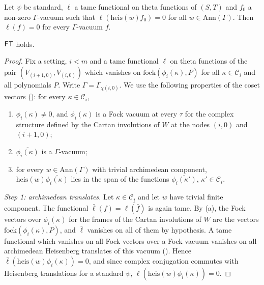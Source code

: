 \begin{lemma}\label{pf:fs:irr}
Let $\psi$ be standard, $\ell$ a tame functional on theta functions of $(S,T)$ and $f_0$ a non-zero $\Gamma$-vacuum such that
$\ell(\mathrm{heis}(w)f_0)=0$ for all $w\in\mathrm{Ann}(\Gamma)$. Then $\ell(f)=0$ for every $\Gamma$-vacuum $f$.
\end{lemma}

\begin{proposition}\label{pf:fs:fockTot}
$\mathsf{FT}$ holds.
\end{proposition}

\begin{proof}
Fix a setting, $i<m$ and a tame functional $\ell$ on theta functions of the pair $(V_{(i+1,0)},V_{(i,0)})$ which vanishes on
$\overline{\mathrm{fock}(\phi_i(\kappa),P)}$ for all $\kappa\in\mathcal C_i$ and all polynomials $P$. Write $\Gamma=\Gamma_{\chi(i,0)}$.
We use the following properties of the coset vectors ():
for every $\kappa\in\mathcal C_i$,
\begin{enumerate}[label=(\alph*)]
\item $\phi_i(\kappa)\ne0$, and $\phi_i(\kappa)$ is a Fock vacuum at every $\tau$ for the complex structure defined by the Cartan
involutions of $W$ at the nodes $(i,0)$ and $(i+1,0)$;
\item $\overline{\phi_i(\kappa)}$ is a $\Gamma$-vacuum;
\item for every $w\in\mathrm{Ann}(\Gamma)$ with trivial archimedean component, $\mathrm{heis}(w)\overline{\phi_i(\kappa)}$ lies in the span of
the functions $\overline{\phi_i(\kappa')}$, $\kappa'\in\mathcal C_i$.
\end{enumerate}

\emph{Step 1: archimedean translates.} Let $\kappa\in\mathcal C_i$ and let $w$ have trivial finite component. The functional
$\bar\ell(f)=\overline{\ell(\bar f)}$ is again tame. By (a), the Fock vectors over $\phi_i(\kappa)$ for the frames of the Cartan
involutions of $W$ are the vectors $\mathrm{fock}(\phi_i(\kappa),P)$, and $\bar\ell$ vanishes on all of them by hypothesis. A tame
functional which vanishes on all Fock vectors over a Fock vacuum vanishes on all archimedean Heisenberg translates of this vacuum
(). Hence $\bar\ell(\mathrm{heis}(w)\phi_i(\kappa))=0$, and since
complex conjugation commutes with Heisenberg translations for a standard $\psi$, $\ell(\mathrm{heis}(w)\overline{\phi_i(\kappa)})=0$.


\end{proof}
